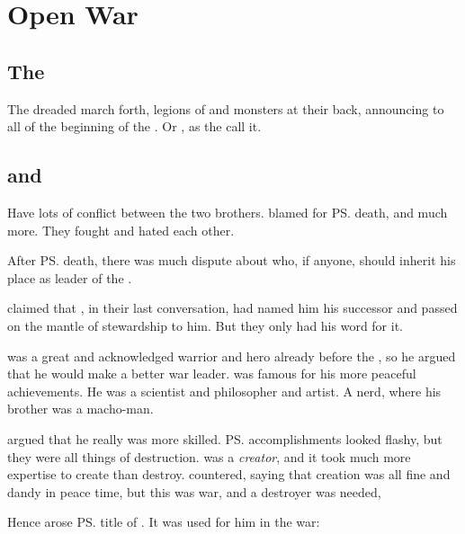 \section{Open War}
\subsection{The \secondbanewar}
\index{\secondbanewar}
The dreaded \satharioth{} march forth, legions of \banes{} and monsters at their back, 
announcing to all of \Miith{} the beginning of the \secondbanewar.
Or , as the \resphain{} call it. 











\subsection{\Ishnaruchaefir{} and \Secherdamon}
Have lots of conflict between the two brothers. 
\Secherdamon{} blamed \Ishnaruchaefir{} for \ps{\Nexagglachel} death, and much more. 
They fought and hated each other. 

After \ps{\Nexagglachel} death, there was much dispute about who, if anyone, should inherit his place as leader of the \dragons{}. 

\Ishnaruchaefir{} claimed that \Nexagglachel, in their last conversation, had named him his successor and passed on the mantle of stewardship to him. 
But they only had his word for it. 

\Ishnaruchaefir{} was a great and acknowledged warrior and hero already before the \secondbanewar, so he argued that he would make a better war leader. 
\Secherdamon{} was famous for his more peaceful achievements. 
He was a scientist and philosopher and artist.
A nerd, where his brother was a macho-man. 

\Secherdamon{} argued that he really was more skilled. 
\ps{\Ishnaruchaefir} accomplishments looked flashy, but they were all things of destruction. 
\Secherdamon{} was a \emph{creator}, and it took much more expertise to create than destroy. 
\Ishnaruchaefir{} countered, saying that creation was all fine and dandy in peace time, but this was war, and a destroyer was needed, 

Hence arose \ps{\Ishnaruchaefir} title of . 
It was used for him in the war: 
\begin{prose}
\end{prose}

